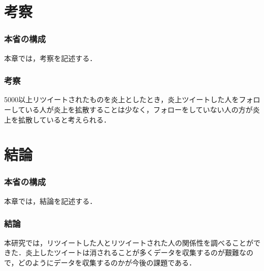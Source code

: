 \chapter{考察}
\subsection{本省の構成}
本章では，考察を記述する．
\subsection{考察}
5000以上リツイートされたものを炎上としたとき，炎上ツイートした人をフォローしている人が炎上を拡散することは少なく，フォローをしていない人の方が炎上を拡散していると考えられる．

\clearpage

\chapter{結論}
\subsection{本省の構成}
本章では，結論を記述する．
\subsection{結論}
本研究では，リツイートした人とリツイートされた人の関係性を調べることができた．炎上したツイートは消されることが多くデータを収集するのが艱難なので，どのようにデータを収集するのかが今後の課題である．




